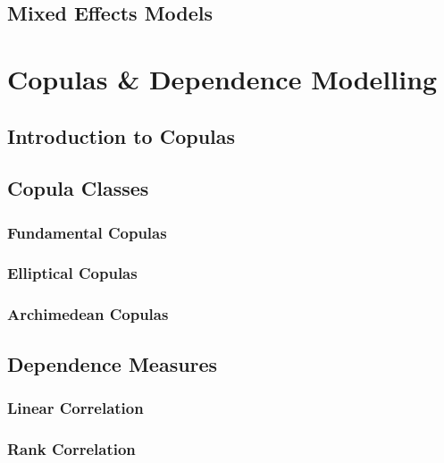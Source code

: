\documentclass[12pt]{article}
\numberwithin{equation}{section}
\numberwithin{table}{section}
\numberwithin{figure}{section}
\begin{document}
\subsection{Mixed Effects Models} \label{ssec:mixed_models}

%
\clearpage

\section{Copulas \& Dependence Modelling} \label{sec:copulas_and_dependence_moelling}

\subsection{Introduction to Copulas} \label{ssec:intro_to_copulas}

\subsection{Copula Classes} \label{ssec:copula_classes}

\subsubsection{Fundamental Copulas} \label{sssec:fundamental_copulas}

\subsubsection{Elliptical Copulas} \label{sssec:elliptical_copulas}

\subsubsection{Archimedean Copulas} \label{sssec:archimedean_copulas}

\subsection{Dependence Measures} \label{ssec:dependence_measures}

\subsubsection{Linear Correlation} \label{sssec:linear_correlation}

\subsubsection{Rank Correlation} \label{sssec:rank_correlation}

\end{document}
